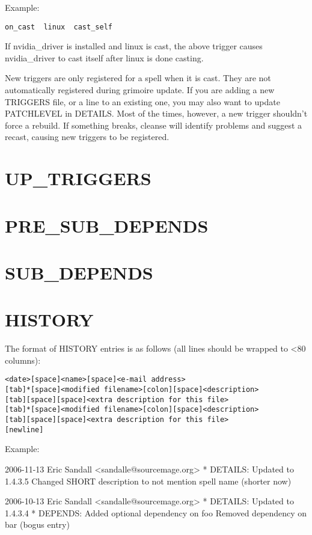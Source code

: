 \documentclass[a4paper,10pt]{book}
\begin{document}
Example:
\begin{verbatim}
on_cast  linux  cast_self
\end{verbatim}

If nvidia\_driver is installed and linux is cast, the above trigger causes
nvidia\_driver to cast itself after linux is done casting.

New triggers are only registered for a spell when it is cast. They are not
automatically registered during grimoire update. If you are adding a new
TRIGGERS file, or a line to an existing one, you may also want to update
PATCHLEVEL in DETAILS. Most of the times, however, a new trigger shouldn't
force a rebuild. If something breaks, cleanse will identify problems and
suggest a recast, causing new triggers to be registered.

\section{UP\_TRIGGERS}
\section{PRE\_SUB\_DEPENDS}
\section{SUB\_DEPENDS}
\section{HISTORY}
The format of HISTORY entries is as follows (all lines should be wrapped
to <80 columns):
\begin{verbatim}
<date>[space]<name>[space]<e-mail address>
[tab]*[space]<modified filename>[colon][space]<description>
[tab][space][space]<extra description for this file>
[tab]*[space]<modified filename>[colon][space]<description>
[tab][space][space]<extra description for this file>
[newline]
\end{verbatim}

Example:
\begin{verbatim*}
2006-11-13 Eric Sandall <sandalle@sourcemage.org>
	* DETAILS: Updated to 1.4.3.5
	  Changed SHORT description to not mention spell name (shorter now)

2006-10-13 Eric Sandall <sandalle@sourcemage.org>
	* DETAILS: Updated to 1.4.3.4
	* DEPENDS: Added optional dependency on foo
	  Removed dependency on bar (bogus entry)
\end{verbatim*}
\end{document}

